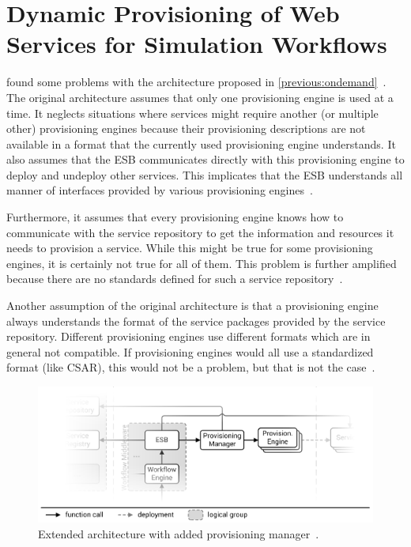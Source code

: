 \section{Dynamic Provisioning of Web Services for Simulation Workflows}
\label{previous:dynamic}

\citeauthor*{provisioning:dynamic} found some problems with the architecture proposed in \autoref{previous:ondemand}~\autocite{provisioning:dynamic}.
The original architecture assumes that only one provisioning engine is used at a time.
It neglects situations where services might require another (or multiple other) provisioning engines because their provisioning descriptions are not available in a format that the currently used provisioning engine understands.
It also assumes that the ESB communicates directly with this provisioning engine to deploy and undeploy other services.
This implicates that the ESB understands all manner of interfaces provided by various provisioning engines~\autocite{provisioning:dynamic}.

Furthermore, it assumes that every provisioning engine knows how to communicate with the service repository to get the information and resources it needs to provision a service.
While this might be true for some provisioning engines, it is certainly not true for all of them.
This problem is further amplified because there are no standards defined for such a service repository~\autocite{provisioning:dynamic}.

Another assumption of the original architecture is that a provisioning engine always understands the format of the service packages provided by the service repository.
Different provisioning engines use different formats which are in general not compatible.
If provisioning engines would all use a standardized format (like CSAR), this would not be a problem, but that is not the case~\autocite{provisioning:dynamic}.

\begin{figure}[!htbp]
	\centering
	\includegraphics[resolution=600]{previous/assets/valeri_architecture}
	\caption{Extended architecture with added provisioning manager~\autocite[based on][]{serviceselection}.}
	\label{image:valeri_architecture}
\end{figure}

